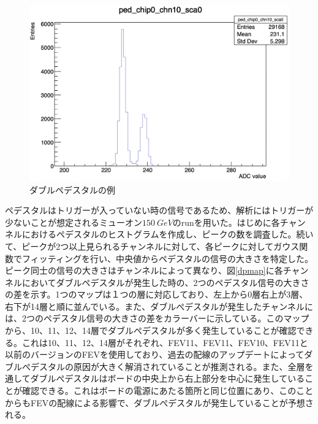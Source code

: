 \begin{figure}[H]
\begin{center}
 \includegraphics[keepaspectratio, scale=0.3]
 	{Figure/Beamtest/dp.png}
 		\caption{ダブルペデスタルの例}
		\label{dp}
\end{center}
\end{figure}
ペデスタルはトリガーが入っていない時の信号であるため、解析にはトリガーが少ないことが想定されるミューオン$\SI{150}{GeV}$のrunを用いた。はじめに各チャンネルにおけるペデスタルのヒストグラムを作成し、ピークの数を調査した。続いて、ピークが2つ以上見られるチャンネルに対して、各ピークに対してガウス関数でフィッティングを行い、中央値からペデスタルの信号の大きさを特定した。ピーク同士の信号の大きさはチャンネルによって異なり、図\ref{dpmap}に各チャンネルにおいてダブルペデスタルが発生した時の、2つのペデスタル信号の大きさの差を示す。1つのマップは１つの層に対応しており、左上から0層右上が3層、右下が14層と順に並んでいる。また、ダブルぺデスタルが発生したチャンネルには、2つのペデスタル信号の大きさの差をカラーバーに示している。このマップから、10、11、12、14層でダブルぺデスタルが多く発生していることが確認できる。これは10、11、12、14層がそれぞれ、FEV11、FEV11、FEV10、FEV11と以前のバージョンのFEVを使用しており、過去の配線のアップデートによってダブルぺデスタルの原因が大きく解消されていることが推測される。また、全層を通してダブルぺデスタルはボードの中央上から右上部分を中心に発生していることが確認できる。これはボードの電源にあたる箇所と同じ位置にあり、このことからもFEVの配線による影響で、ダブルぺデスタルが発生していることが予想される。
